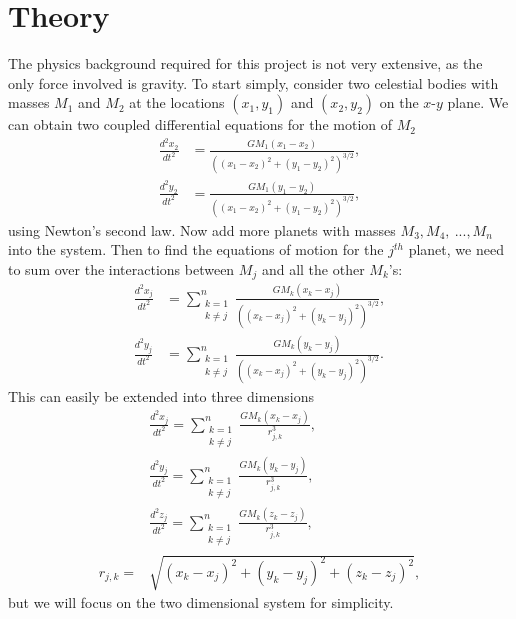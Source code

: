 \documentclass[prb,aps,twocolumn,showpacs,10pt]{revtex4-1}
\begin{document}
\section{Theory}

The physics background required for this project is not very extensive, as the only force involved is gravity. To start simply, consider two celestial bodies with masses $M_1$ and $M_2$ at the locations $(x_1,y_1)$ and $(x_2,y_2)$ on the $x$-$y$ plane. We can obtain two coupled differential equations for the motion of $M_2$
\begin{equation}
\begin{split}
\frac{d^2x_2}{dt^2} &= \frac{GM_1(x_1-x_2)}{((x_1-x_2)^2+(y_1-y_2)^2)^{3/2}},\\
\frac{d^2y_2}{dt^2} &= \frac{GM_1(y_1-y_2)}{((x_1-x_2)^2+(y_1-y_2)^2)^{3/2}},
\end{split}
\end{equation}
\noindent using Newton's second law. Now add more planets with masses $M_3, M_4, \ ..., M_n$ into the system. Then to find the equations of motion for the $j^{th}$ planet, we need to sum over the interactions between $M_j$ and all the other $M_k$'s:
\begin{equation}
\begin{split}
\frac{d^2x_j}{dt^2} &= \sum_{\substack{{k = 1}\\k \neq j}}^n \frac{GM_k(x_k-x_j)}{((x_k-x_j)^2+(y_k-y_j)^2)^{3/2}},\\
\frac{d^2y_j}{dt^2} &= \sum_{\substack{{k = 1}\\k \neq j}}^n \frac{GM_k(y_k-y_j)}{((x_k-x_j)^2+(y_k-y_j)^2)^{3/2}}.
\end{split}
\end{equation}
\noindent This can easily be extended into three dimensions
\begin{equation}
\begin{split}
&\frac{d^2x_j}{dt^2} = \sum_{\substack{{k = 1}\\k \neq j}}^n \frac{GM_k(x_k-x_j)}{r_{j,k}^3},\\
&\frac{d^2y_j}{dt^2} = \sum_{\substack{{k = 1}\\k \neq j}}^n \frac{GM_k(y_k-y_j)}{r_{j,k}^3},\\
&\frac{d^2z_j}{dt^2} = \sum_{\substack{{k = 1}\\k \neq j}}^n \frac{GM_k(z_k-z_j)}{r_{j,k}^3},\\
r_{j,k} = &\sqrt{(x_k-x_j)^2+(y_k-y_j)^2+(z_k-z_j)^2},
\end{split}
\end{equation}
but we will focus on the two dimensional system for simplicity. 
\end{document}
